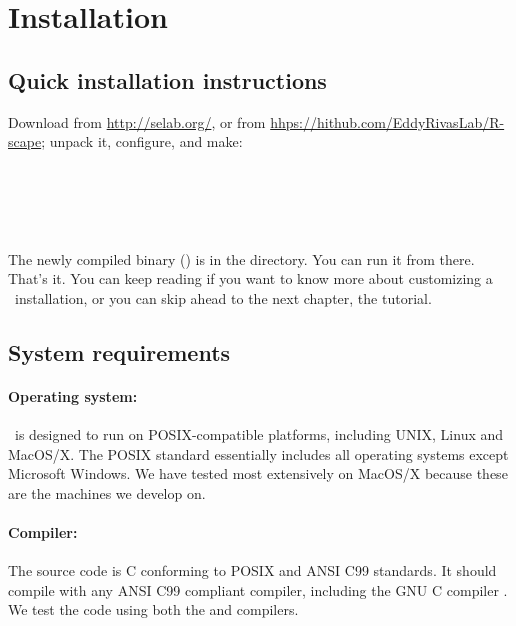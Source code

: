 \section{Installation}
\label{section:installation}
\setcounter{footnote}{0}

\subsection{Quick installation instructions}

Download  from
\url{http://selab.org/}, or from
\url{hhps://hithub.com/EddyRivasLab/R-scape}; unpack it, configure,
and make:\\

\\
\\
\\ 
\\
\\

The newly compiled binary (\prog{\rscape}) is in the
 directory. You can run it from there.\\

That's it.  You can keep reading if you want to know more about
customizing a \rscape\ installation, or you can skip ahead to the next
chapter, the tutorial.


\subsection{System requirements}

\paragraph{Operating system:} \rscape\ is designed to run on
POSIX-compatible platforms, including UNIX, Linux and MacOS/X. The
POSIX standard essentially includes all operating systems except
Microsoft Windows. We have tested most extensively on MacOS/X because
these are the machines we develop on.

\paragraph{Compiler:} The source code is C conforming to POSIX and ANSI
C99 standards. It should compile with any ANSI C99 compliant compiler,
including the GNU C compiler . We test the code using both
the  and  compilers. 

